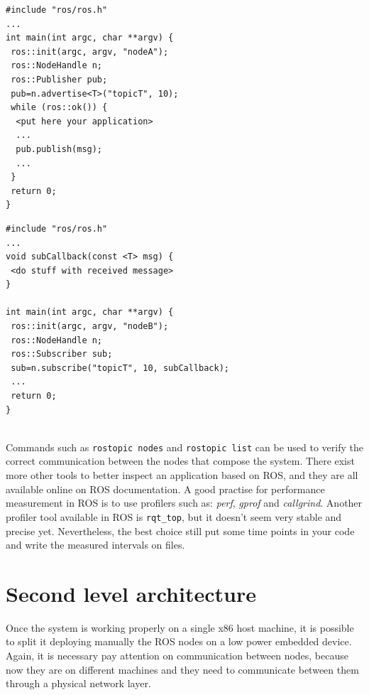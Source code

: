 \noindent\begin{minipage}{.475\textwidth}
\begin{verbatim}
#include "ros/ros.h"
...
int main(int argc, char **argv) {
 ros::init(argc, argv, "nodeA");
 ros::NodeHandle n;
 ros::Publisher pub;
 pub=n.advertise<T>("topicT", 10);
 while (ros::ok()) {
  <put here your application>
  ...
  pub.publish(msg);
  ...
 }
 return 0;
}
\end{verbatim}
\end{minipage}\hfill
\begin{minipage}{.475\textwidth}
\begin{verbatim}
#include "ros/ros.h"
...
void subCallback(const <T> msg) {
 <do stuff with received message>
}

int main(int argc, char **argv) {
 ros::init(argc, argv, "nodeB");
 ros::NodeHandle n;
 ros::Subscriber sub;
 sub=n.subscribe("topicT", 10, subCallback);
 ...
 return 0;
}
\end{verbatim}
\end{minipage}
\\


Commands such as \texttt{rostopic nodes} and \texttt{rostopic list} can be used to verify the correct communication between the nodes that compose the system.
There exist more other tools to better inspect an application based on ROS, and they are all available online on ROS documentation.
A good practise for performance measurement in ROS is to use profilers such as: \textit{perf}, \textit{gprof} and \textit{callgrind}. Another profiler tool available in ROS is \texttt{rqt_top}, but it doesn't seem very stable and precise yet. Nevertheless, the best choice still put some time points in your code and write the measured intervals on files.



\section{Second level architecture}
Once the system is working properly on a single x86 host machine, it is possible to split it deploying manually the ROS nodes on a low power embedded device.
Again, it is necessary pay attention on communication between nodes, because now they are on different machines and they need to communicate between them through a physical network layer.

